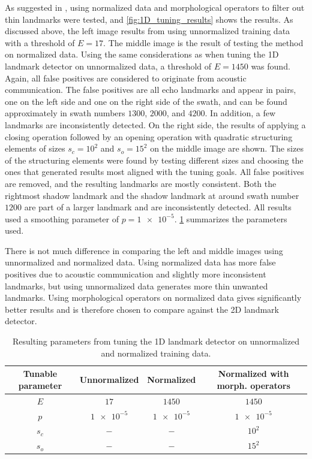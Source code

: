 As suggested in \cite{Al-Rawi2017LandmarkImages}, using normalized data and morphological operators to filter out thin landmarks were tested, and \cref{fig:1D_tuning_results} shows the results. As discussed above, the left image results from using unnormalized training data with a threshold of $E = 17$. The middle image is the result of testing the method on normalized data. Using the same considerations as when tuning the 1D landmark detector on unnormalized data, a threshold of $E = 1450$ was found. Again, all false positives are considered to originate from acoustic communication. The false positives are all echo landmarks and appear in pairs, one on the left side and one on the right side of the swath, and can be found approximately in swath numbers $1300$, $2000$, and $4200$. In addition, a few landmarks are inconsistently detected. On the right side, the results of applying a closing operation followed by an opening operation with quadratic structuring elements of sizes $s_c = 10^2$ and $s_o = 15^2$ on the middle image are shown. The sizes of the structuring elements were found by testing different sizes and choosing the ones that generated results most aligned with the tuning goals. All false positives are removed, and the resulting landmarks are mostly consistent. Both the rightmost shadow landmark and the shadow landmark at around swath number $1200$ are part of a larger landmark and are inconsistently detected. All results used a smoothing parameter of $p = \num{1e-5}$. \cref{tab:1D_parameters} summarizes the parameters used. 

There is not much difference in comparing the left and middle images using unnormalized and normalized data. Using normalized data has more false positives due to acoustic communication and slightly more inconsistent landmarks, but using unnormalized data generates more thin unwanted landmarks. Using morphological operators on normalized data gives significantly better results and is therefore chosen to compare against the 2D landmark detector.

\begin{table}
    \caption{Resulting parameters from tuning the 1D landmark detector on unnormalized and normalized training data.}
    \centering
    \begin{tabular}{cccc}
        \hline
        \textbf{Tunable parameter} & \textbf{Unnormalized} & \textbf{Normalized} & \textbf{Normalized with morph. operators} \\ \hline
        $E$                        & $17$                  & $1450$              & $1450$                                    \\
        $p$                        & $\num{1e-5}$          & $\num{1e-5}$        & $\num{1e-5}$                              \\
        $s_c$                      & $-$                   & $-$                 & $10^2$                                    \\
        $s_o$                      & $-$                   & $-$                 & $15^2$                                    \\ \hline
    \end{tabular}
    \label{tab:1D_parameters}
\end{table}

